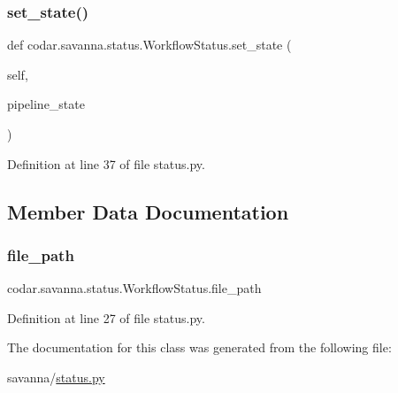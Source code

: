 \subsubsection{\texorpdfstring{set\+\_\+state()}{set\_state()}}
{\footnotesize\ttfamily def codar.\+savanna.\+status.\+Workflow\+Status.\+set\+\_\+state (\begin{DoxyParamCaption}\item[{}]{self,  }\item[{}]{pipeline\+\_\+state }\end{DoxyParamCaption})}



Definition at line 37 of file status.\+py.



\subsection{Member Data Documentation}
\mbox{\label{classcodar_1_1savanna_1_1status_1_1_workflow_status_ae4eb41515ae3ac77a11e1905835497e6}} 
\subsubsection{\texorpdfstring{file\+\_\+path}{file\_path}}
{\footnotesize\ttfamily codar.\+savanna.\+status.\+Workflow\+Status.\+file\+\_\+path}



Definition at line 27 of file status.\+py.



The documentation for this class was generated from the following file\+:\begin{DoxyCompactItemize}
\item 
savanna/\hyperlink{savanna_2status_8py}{status.\+py}\end{DoxyCompactItemize}
